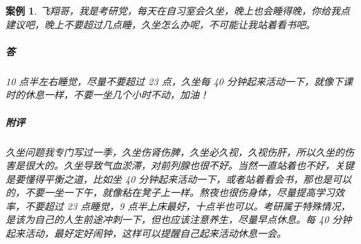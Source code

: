 \documentclass{ctexart}
\newtheorem{case}{案例}
\begin{document}
\begin{case}
    飞翔哥，我是考研党，每天在自习室会久坐，晚上也会睡得晚，你给我点建议吧，晚上不要超过几点睡，久坐怎么办呢，不可能让我站着看书吧。
    \subparagraph{答} 10 点半左右睡觉，尽量不要超过 23 点，久坐每 40 分钟起来活动一下，就像下课时的休息一样，不要一坐几个小时不动，加油！
    \subparagraph{附评} 久坐问题我专门写过一季，久坐伤肾伤脾，久坐必久视，久视伤肝，所以久坐的伤害是很大的。久坐导致气血淤滞，对前列腺也很不好。当然一直站着也不好，关键是要懂得平衡之道，比如坐 40 分钟起来活动一下，或者站着看会书，那也是可以的，不要一坐一下午，就像粘在凳子上一样。熬夜也很伤身体，尽量提高学习效率，不要超过 23 点睡觉，9 点半上床最好，十点半也可以。考研属于特殊情况，是该为自己的人生前途冲刺一下，但也应该注意养生，尽量早点休息。每 40 分钟起来活动，最好定好闹钟，这样可以提醒自己起来活动休息一会。
\end{case}
\end{document}
